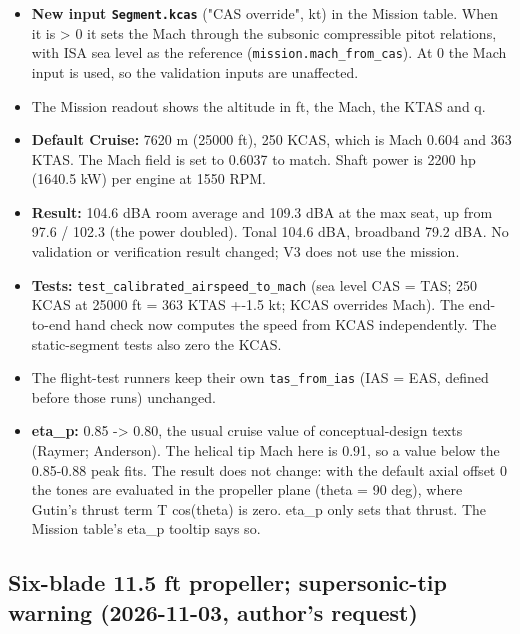 \documentclass[10pt,a4paper]{article}
\begin{document}
\begin{itemize}
\item \textbf{New input \texttt{Segment.\allowbreak{}kcas}} ("CAS override", kt) in the Mission table. When it is > 0 it sets the Mach through the subsonic compressible pitot relations, with ISA sea level as the reference (\texttt{mission.\allowbreak{}mach\_\allowbreak{}from\_\allowbreak{}cas}). At 0 the Mach input is used, so the validation inputs are unaffected.
\item The Mission readout shows the altitude in ft, the Mach, the KTAS and q.
\item \textbf{Default Cruise:} 7620 m (25000 ft), 250 KCAS, which is Mach 0.604 and 363 KTAS. The Mach field is set to 0.6037 to match. Shaft power is 2200 hp (1640.5 kW) per engine at 1550 RPM.
\item \textbf{Result:} 104.6 dBA room average and 109.3 dBA at the max seat, up from 97.6 / 102.3 (the power doubled). Tonal 104.6 dBA, broadband 79.2 dBA. No validation or verification result changed; V3 does not use the mission.
\item \textbf{Tests:} \texttt{test\_\allowbreak{}calibrated\_\allowbreak{}airspeed\_\allowbreak{}to\_\allowbreak{}mach} (sea level CAS = TAS; 250 KCAS at 25000 ft = 363 KTAS +-1.5 kt; KCAS overrides Mach). The end-to-end hand check now computes the speed from KCAS independently. The static-segment tests also zero the KCAS.
\item The flight-test runners keep their own \texttt{tas\_\allowbreak{}from\_\allowbreak{}ias} (IAS = EAS, defined before those runs) unchanged.
\item \textbf{eta\_p:} 0.85 -> 0.80, the usual cruise value of conceptual-design texts (Raymer; Anderson). The helical tip Mach here is 0.91, so a value below the 0.85-0.88 peak fits. The result does not change: with the default axial offset 0 the tones are evaluated in the propeller plane (theta = 90 deg), where Gutin's thrust term T cos(theta) is zero. eta\_p only sets that thrust. The Mission table's eta\_p tooltip says so.
\end{itemize}

\subsection*{Six-blade 11.5 ft propeller; supersonic-tip warning (2026-11-03, author's request)}
\end{document}
